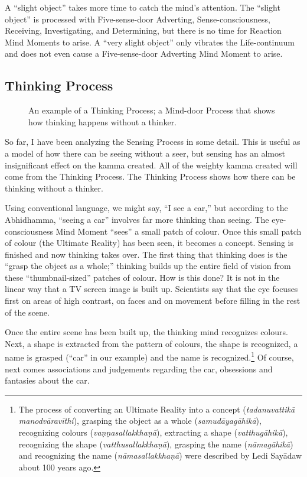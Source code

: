 A “slight object” takes more time to catch the mind’s attention. The “slight object” is processed with Five-sense-door Adverting, Sense-consciousness, Receiving, Investigating, and Determining, but there is no time for Reaction Mind Moments to arise. A “very slight object” only vibrates the Life-continuum and does not even cause a Five-sense-door Adverting Mind Moment to arise.

\subsection*{Thinking Process}

\begin{figure}[h]
\centering

\caption{An example of a Thinking Process; a Mind-door Process that shows how thinking happens without a thinker.}
\label{fig:Process2}
\end{figure}

So far, I have been analyzing the Sensing Process in some detail. This is useful as a model of how there can be seeing without a seer, but sensing has an almost insignificant effect on the kamma created. All of the weighty kamma created will come from the Thinking Process. The Thinking Process shows how there can be thinking without a thinker.

Using conventional language, we might say, “I see a car,” but according to the Abhidhamma, “seeing a car” involves far more thinking than seeing. The eye-consciousness Mind Moment “sees” a small patch of colour. Once this small patch of colour (the Ultimate Reality) has been seen, it becomes a concept. Sensing is finished and now thinking takes over. The first thing that thinking does is the “grasp the object as a whole;” thinking builds up the entire field of vision from these “thumbnail-sized” patches of colour. How is this done? It is not in the linear way that a TV screen image is built up. Scientists say that the eye focuses first on areas of high contrast, on faces and on movement before filling in the rest of the scene.

\pagebreak

Once the entire scene has been built up, the thinking mind recognizes colours. Next, a shape is extracted from the pattern of colours, the shape is recognized, a name is grasped (“car” in our example) and the name is recognized.\footnote{The process of converting an Ultimate Reality into a concept (\textit{tadanuvattikā manodvāravīthi}), grasping the object as a whole (\textit{samudāyagāhikā}), recognizing colours (\textit{vaṇṇasallakkhaṇā}), extracting a shape (\textit{vatthugāhikā}), recognizing the shape (\textit{vatthusallakkhaṇā}), grasping the name (\textit{nāmagāhikā}) and recognizing the name (\textit{nāmasallakkhaṇā}) were described by Ledi Sayādaw about 100 years ago.} Of course, next comes associations and judgements regarding the car, obsessions and fantasies about the car.

